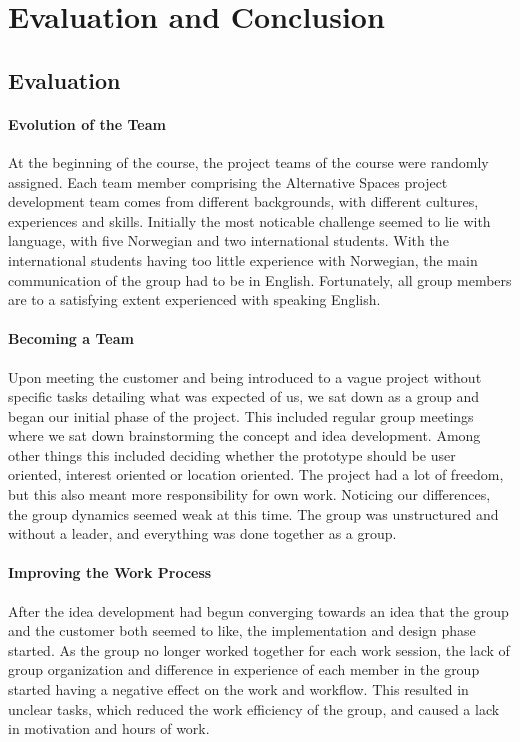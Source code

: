 \chapter{Evaluation and Conclusion}
\label{chap:Eval}

\section{Evaluation} 
\subsubsection{Evolution of the Team} At the beginning of the course, the project teams of the course were randomly assigned. Each team member comprising the Alternative Spaces project development team comes from different backgrounds, with different cultures, experiences and skills. Initially the most noticable challenge seemed to lie with language, with five Norwegian and two international students. With the international students having too little experience with Norwegian, the main communication of the group had to be in English. Fortunately, all group members are to a satisfying extent experienced with speaking English. 
\subsubsection{Becoming a Team} Upon meeting the customer and being introduced to a vague project without specific tasks detailing what was expected of us, we sat down as a group and began our initial phase of the project. This included regular group meetings where we sat down brainstorming the concept and idea development. Among other things this included deciding whether the prototype should be user oriented, interest oriented or location oriented. The project had a lot of freedom, but this also meant more responsibility for own work. Noticing our differences, the group dynamics seemed weak at this time. The group was unstructured and without a leader, and everything was done together as a group.
\subsubsection{Improving the Work Process} After the idea development had begun converging towards an idea that the group and the customer both seemed to like, the implementation and design phase started. As the group no longer worked together for each work session, the lack of group organization and difference in experience of each member in the group started having a negative effect on the work and workflow. This resulted in unclear tasks, which reduced the work efficiency of the group, and caused a lack in motivation and hours of work.
